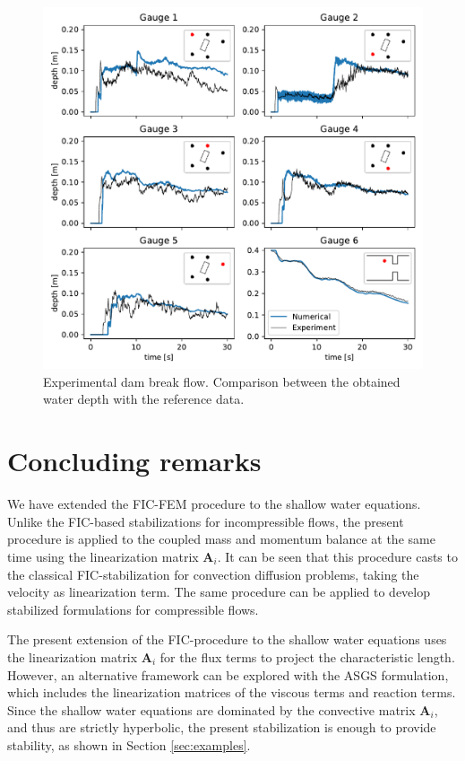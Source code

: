\documentclass[a4paper,12pt]{elsarticle}
\begin{document}
\begin{figure}
\centering
\includegraphics[width=\textwidth]{img/exp/gauges.pdf}
\caption{Experimental dam break flow. Comparison between the obtained water depth with the reference data.}
\label{experiment_gauges}
\end{figure}



\section{Concluding remarks} \label{sec:conclusions}

We have extended the FIC-FEM procedure to the shallow water equations. Unlike the FIC-based stabilizations for incompressible flows, the present procedure is applied to the coupled mass and momentum balance at the same time using the linearization matrix $\mathbf{A}_i$. It can be seen that this procedure casts to the classical FIC-stabilization for convection diffusion problems, taking the velocity as linearization term. The same procedure can be applied to develop stabilized formulations for compressible flows.

The present extension of the FIC-procedure to the shallow water equations uses the linearization matrix $\mathbf{A}_i$ for the flux terms to project the characteristic length. However, an alternative framework can be explored with the ASGS \cite{hughes1995,codina2008} formulation, which includes the linearization matrices of the viscous terms and reaction terms. Since the shallow water equations are dominated by the convective matrix $\mathbf{A}_i$, and thus are strictly hyperbolic, the present stabilization is enough to provide stability, as shown in Section \ref{sec:examples}.
\end{document}
